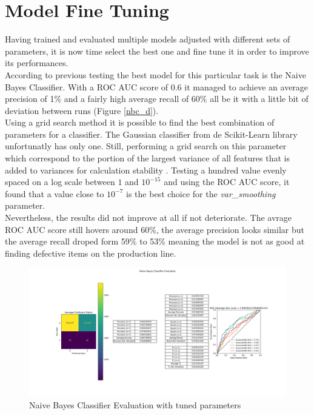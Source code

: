 \section{Model Fine Tuning}
\label{model_tuning}
Having trained and evaluated multiple models adjusted with different sets of parameters, it is now time select the best one and fine tune it in order to improve its performances.\\

According to previous testing the best model for this particular task is the Naive Bayes Classifier. With a ROC AUC score of 0.6 it managed to achieve an average precision of 1\% and a fairly high average recall of 60\% all be it with a little bit of deviation between runs (Figure \ref{nbc_d}).\\

Using a grid search method \cite{grid_scikit} it is possible to find the best combination of parameters for a classifier. The Gaussian classifier from de Scikit-Learn library unfortunatly has only one. Still, performing a grid search on this parameter which correspond to the portion of the largest variance of all features that is added to variances for calculation stability \cite{nbc_scikit}. Testing a hundred value evenly spaced on a log scale between \(1\) and \(10^{-15}\) and using the ROC AUC score, it found that a value close to \(10^{-7}\) is the best choice for the \textit{var\_smoothing} parameter.\\

Nevertheless, the results did not improve at all if not deteriorate. The avrage ROC AUC score still hovers around 60\%, the average precision looks similar but the average recall droped form 59\% to 53\% meaning the model is not as good at finding defective items on the production line.

\begin{figure}
    \center
    \includegraphics[scale=0.32]{img/nbc_gd.png}
    \caption{Naive Bayes Classifier Evaluation with tuned parameters}
    \label{nbc}
\end{figure}
